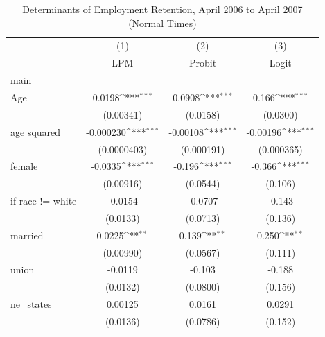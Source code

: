 \begin{table}[htbp]\centering
\def\sym#1{\ifmmode^{#1}\else\(^{#1}\)\fi}
\caption{Determinants of Employment Retention, April 2006 to April 2007 (Normal Times)\label{tab:prob1-parth}}
\footnotesize
\renewcommand{\arraystretch}{0.9}
\begin{tabular}{l*{3}{c}}
\toprule
                    &\multicolumn{1}{c}{(1)}&\multicolumn{1}{c}{(2)}&\multicolumn{1}{c}{(3)}\\
                    &\multicolumn{1}{c}{LPM}&\multicolumn{1}{c}{Probit}&\multicolumn{1}{c}{Logit}\\
\midrule
main                &                     &                     &                     \\
Age                 &      0.0198\sym{***}&      0.0908\sym{***}&       0.166\sym{***}\\
                    &   (0.00341)         &    (0.0158)         &    (0.0300)         \\
\addlinespace
age squared         &   -0.000230\sym{***}&    -0.00108\sym{***}&    -0.00196\sym{***}\\
                    & (0.0000403)         &  (0.000191)         &  (0.000365)         \\
\addlinespace
female              &     -0.0335\sym{***}&      -0.196\sym{***}&      -0.366\sym{***}\\
                    &   (0.00916)         &    (0.0544)         &     (0.106)         \\
\addlinespace
=1 if race != white &     -0.0154         &     -0.0707         &      -0.143         \\
                    &    (0.0133)         &    (0.0713)         &     (0.136)         \\
\addlinespace
married             &      0.0225\sym{**} &       0.139\sym{**} &       0.250\sym{**} \\
                    &   (0.00990)         &    (0.0567)         &     (0.111)         \\
\addlinespace
union               &     -0.0119         &      -0.103         &      -0.188         \\
                    &    (0.0132)         &    (0.0800)         &     (0.156)         \\
\addlinespace
ne\_states           &     0.00125         &      0.0161         &      0.0291         \\
                    &    (0.0136)         &    (0.0786)         &     (0.152)         \\

\end{tabular}
\end{table}
